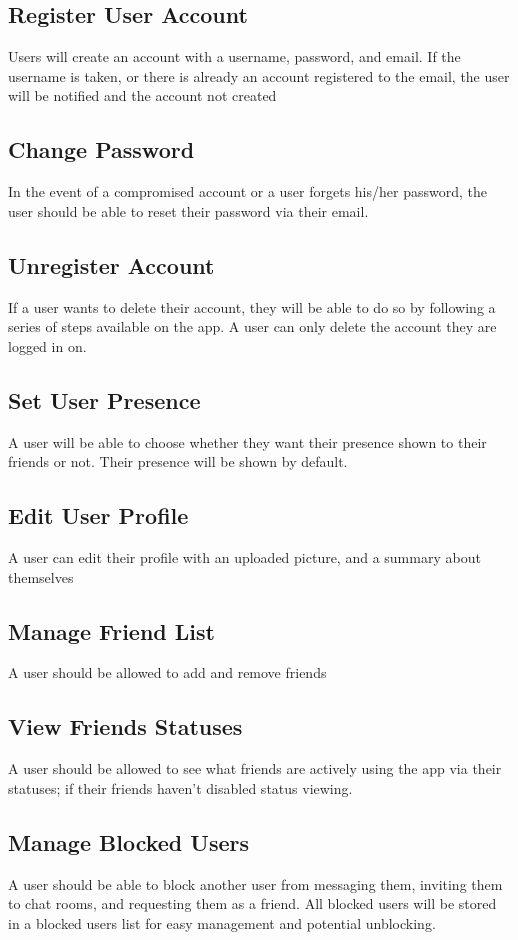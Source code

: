 \documentclass[11pt]{article}
\theoremstyle{plain}
\theoremstyle{definition}
\begin{document}
\subsection{Register User Account}
Users will create an account with a username, password, and email. If the username is taken, or there is already an account registered to the email, the user will be notified and the account not created
\subsection{Change Password}
In the event of a compromised account or a user forgets his/her password, the user should be able to reset their password via their email.
\subsection{Unregister Account}
If a user wants to delete their account, they will be able to do so by following a series of steps available on the app. A user can only delete the account they are logged in on.
\subsection{Set User Presence}
A user will be able to choose whether they want their presence shown to their friends or not. Their presence will be shown by default.
\subsection{Edit User Profile}
A user can edit their profile with an uploaded picture, and a summary about themselves
\subsection{Manage Friend List}
A user should be allowed to add and remove friends
\subsection{View Friends Statuses}
A user should be allowed to see what friends are actively using the app via their statuses; if their friends haven't disabled status viewing. 
\subsection{Manage Blocked Users}
A user should be able to block another user from messaging them, inviting them to chat rooms, and requesting them as a friend. All blocked users will be stored in a blocked users list for easy management and potential unblocking. 
\end{document}
